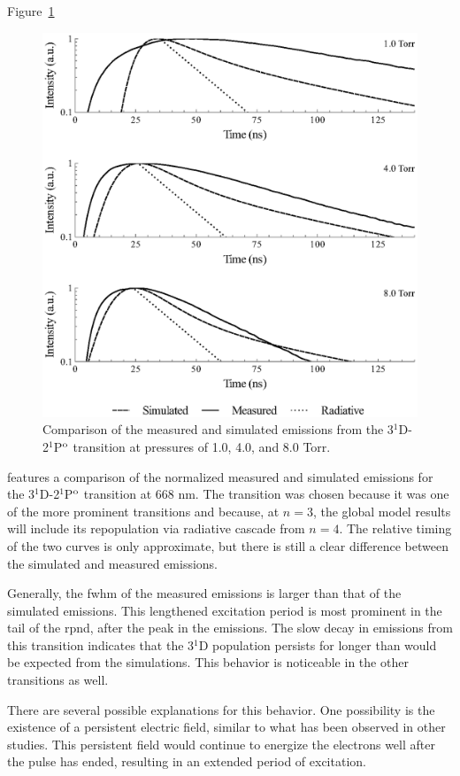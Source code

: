Figure~\ref{fig:667comp}
\begin{figure}
  \centering
  \includegraphics{./chapters/emissions/figures/667comp.eps}
  \caption{Comparison of the measured and simulated emissions from the
  3$^1$D-2$^1$P$^\mathrm{o}$ transition at pressures of 1.0, 4.0, and 8.0 Torr.}
  \label{fig:667comp}
\end{figure}
features a comparison of the normalized measured and simulated emissions for the
3$^1$D-2$^1$P$^\mathrm{o}$ transition at 668 nm. The transition was chosen because it
was one of the more prominent transitions and because, at $n=3$, the global
model results will include its repopulation via radiative cascade from $n=4$.
The relative timing of the two curves is only approximate, but there is still a
clear difference between the simulated and measured emissions.

Generally, the \acs{fwhm} of the measured emissions is larger than that of the
simulated emissions. This lengthened excitation period is most prominent in the
tail of the \acs{rpnd}, after the peak in the emissions. The slow decay in
emissions from this transition indicates that the 3$^1$D population persists for
longer than would be expected from the simulations. This behavior is noticeable
in the other transitions as well.

There are several possible explanations for this behavior. One possibility is
the existence of a persistent electric field, similar to what has been observed
in other studies. This persistent field would continue to energize the electrons
well after the pulse has ended, resulting in an extended period of excitation.

